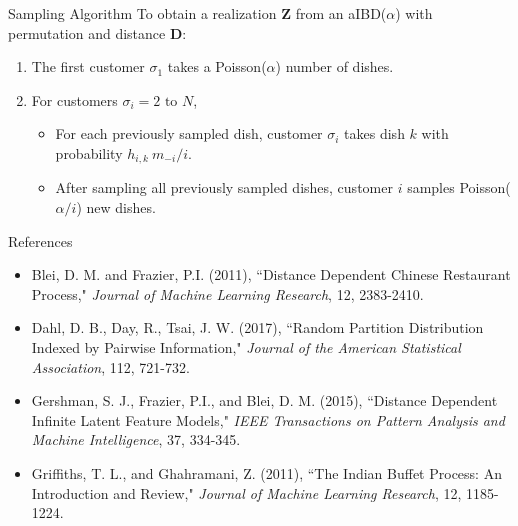 \documentclass[serif,mathserif,final]{beamer}
\begin{document}
\begin{frame}{}
\begin{columns}[t]
\begin{column}{0.32\linewidth}
      \begin{block}{Sampling Algorithm}
        To obtain a realization $\bm Z$ from an aIBD($\alpha$) with permutation
        \bm{$\sigma$} and distance $\bm D$: 
        \vspace{.5em}
        \begin{enumerate}
          \item The first customer $\sigma_1$ takes a Poisson($\alpha$) number of dishes.
          \item For customers $\sigma_i = 2\text{ to } N$,
          \begin{itemize}
            \item For each previously sampled dish,
              customer $\sigma_i$ takes dish $k$ with probability
              $h_{i,k}~m_{-i}/i$.
            \item After sampling all previously sampled dishes, customer
              $i$ samples Poisson($\alpha/i$) new dishes.
          \end{itemize}
        \end{enumerate}
      \end{block}

      \begin{block}{References}
        \begin{itemize}
          \normalsize
          \item
            Blei, D. M. and Frazier, P.I. (2011),
            ``Distance Dependent Chinese Restaurant Process,"
            \emph{Journal of Machine Learning Research}, 12, 2383-2410.
          \item
            Dahl, D. B., Day, R., Tsai, J. W. (2017), ``Random Partition Distribution Indexed by Pairwise Information,"
              \emph{Journal of the American Statistical Association}, 112, 721-732.
          \item
            Gershman, S. J., Frazier, P.I., and Blei, D. M. (2015), ``Distance Dependent Infinite Latent Feature Models," \emph{IEEE Transactions on Pattern Analysis and Machine Intelligence}, 37, 334-345.
          \item
            Griffiths, T. L., and Ghahramani, Z. (2011), ``The Indian Buffet Process: An Introduction and Review," \emph{Journal of Machine Learning Research}, 12, 1185-1224.
        \end{itemize}
      \end{block}

    \end{column}%

  \end{columns}
\end{frame}
\end{document}

